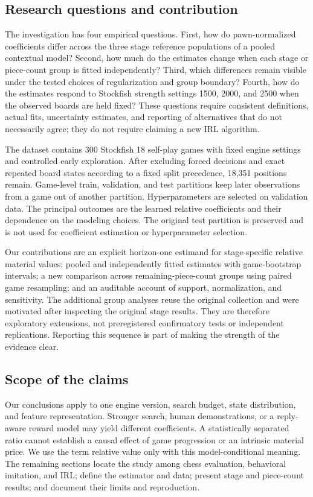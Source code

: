 \documentclass{jcst}
\begin{document}
\subsection{Research questions and contribution}
The investigation has four empirical questions. First, how do pawn-normalized coefficients differ across the three stage reference populations of a pooled contextual model? Second, how much do the estimates change when each stage or piece-count group is fitted independently? Third, which differences remain visible under the tested choices of regularization and group boundary? Fourth, how do the estimates respond to Stockfish strength settings 1500, 2000, and 2500 when the observed boards are held fixed? These questions require consistent definitions, actual fits, uncertainty estimates, and reporting of alternatives that do not necessarily agree; they do not require claiming a new IRL algorithm.

The dataset contains 300 Stockfish 18 self-play games with fixed engine settings and controlled early exploration. After excluding forced decisions and exact repeated board states according to a fixed split precedence, 18,351 positions remain. Game-level train, validation, and test partitions keep later observations from a game out of another partition. Hyperparameters are selected on validation data. The principal outcomes are the learned relative coefficients and their dependence on the modeling choices. The original test partition is preserved and is not used for coefficient estimation or hyperparameter selection.

Our contributions are an explicit horizon-one estimand for stage-specific relative material values; pooled and independently fitted estimates with game-bootstrap intervals; a new comparison across remaining-piece-count groups using paired game resampling; and an auditable account of support, normalization, and sensitivity. The additional group analyses reuse the original collection and were motivated after inspecting the original stage results. They are therefore exploratory extensions, not preregistered confirmatory tests or independent replications. Reporting this sequence is part of making the strength of the evidence clear.

\subsection{Scope of the claims}
Our conclusions apply to one engine version, search budget, state distribution, and feature representation. Stronger search, human demonstrations, or a reply-aware reward model may yield different coefficients. A statistically separated ratio cannot establish a causal effect of game progression or an intrinsic material price. We use the term relative value only with this model-conditional meaning. The remaining sections locate the study among chess evaluation, behavioral imitation, and IRL; define the estimator and data; present stage and piece-count results; and document their limits and reproduction.
\end{document}
